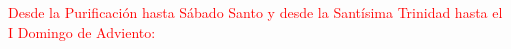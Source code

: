 \documentclass[10pt,twoside]{book}
\begin{document}
\textcolor{red}{Desde la Purificación hasta Sábado Santo y desde la Santísima Trinidad hasta el I Domingo de Adviento:}
\vspace{0.2em}
\begin{paracol}{2}
      \begin{leftcolumn}
            
      \end{leftcolumn}
      \begin{otherlanguage}{latin}
            \begin{rightcolumn}
                  
            \end{rightcolumn}
      \end{otherlanguage}


      \begin{leftcolumn*}
            
      \end{leftcolumn*}
      \begin{otherlanguage}{latin}
            \begin{rightcolumn}
                  
            \end{rightcolumn}
      \end{otherlanguage}
\end{paracol}

\vspace{0.5em}
\end{document}
